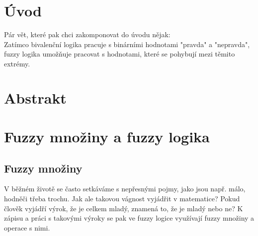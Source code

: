 


\newtheorem{definition}{Definice}
\newtheorem{remark}{Pozn\'amka}
\newtheorem{example}{Příklad}
\newtheorem{graph}{Obr\' azek}
\newtheorem{sentence}{Věta}
\newcommand{\comment}[1]{}

\chapter{Úvod}

\color{blue} Pár vět, které pak chci zakomponovat do \'uvodu nějak:
                \\ 
                \color{black} Zatímco bivalenční logika pracuje s binárními hodnotami "pravda" a "nepravda", fuzzy logika umožňuje pracovat s hodnotami, které se pohybují mezi těmito extrémy.


\chapter{Abstrakt}
\label{abstrakt}




\chapter {Fuzzy mno\v ziny a fuzzy logika}
\section{Fuzzy mno\v ziny} 

\comment{
V klasické i fuzzy logice se často setkáváme se základními pojmy množina a prvek množiny. Množina se obecně vysvětluje jako souhrn, soubor nebo skupina objektů. Tyto objekty pak nazýváme prvky dané množiny. Nejvíce charakteristická vlastnost množin je, že je jednoznačně určena svými prvky, ale ignoruje jejich pořadí a další jejich struktury. Množina, která neobsahuje žádné prvky, se nazývá prázdná množina.
}

V běžném životě se často setkáváme s nepřesnými pojmy, jako jsou např. \clqq málo\crqq, \clqq hodně\crqq \space či třeba \clqq trochu\crqq \space. Jak ale takovou vágnost vyjádřit v matematice? Pokud člověk vyjádří výrok, že je \clqq celkem mladý\crqq, znamená to, že je mladý nebo ne? K zápisu a práci s takovými výroky se pak ve fuzzy logice využívají fuzzy množiny a operace s nimi.

